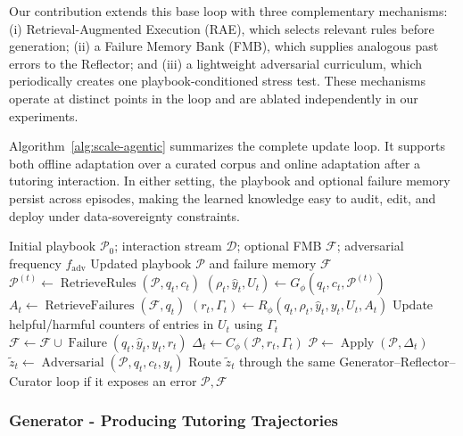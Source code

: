 \documentclass[10pt,conference]{IEEEtran}
\begin{document}
Our contribution extends this base loop with three complementary 
mechanisms: (i) Retrieval-Augmented Execution (RAE), which selects 
relevant rules before generation; (ii) a Failure Memory Bank (FMB), 
which supplies analogous past errors to the Reflector; and (iii) a 
lightweight adversarial curriculum, which periodically creates one 
playbook-conditioned stress test. These mechanisms operate at distinct 
points in the loop and are ablated independently in our experiments.

Algorithm~\ref{alg:scale-agentic} summarizes the complete update loop. 
It supports both offline adaptation over a curated corpus and online 
adaptation after a tutoring interaction. In either setting, the 
playbook and optional failure memory persist across episodes, making 
the learned knowledge easy to audit, edit, and deploy under 
data-sovereignty constraints.

\begin{algorithm}[t]
\caption{Self-improving agentic context engineering.}
\label{alg:scale-agentic}
\begin{algorithmic}[1]
\Require Initial playbook $\mathcal{P}_0$; interaction stream $\mathcal{D}$; optional FMB $\mathcal{F}$; adversarial frequency $f_{\mathrm{adv}}$
\Ensure Updated playbook $\mathcal{P}$ and failure memory $\mathcal{F}$
    \State $\mathcal{P}^{(t)} \gets \operatorname{RetrieveRules}(\mathcal{P},q_t,c_t)$ 
    \State $(\rho_t,\hat y_t,U_t) \gets G_\phi(q_t,c_t,\mathcal{P}^{(t)})$
    \State $A_t \gets \operatorname{RetrieveFailures}(\mathcal{F},q_t)$ 
    \State $(r_t,\Gamma_t) \gets R_\phi(q_t,\rho_t,\hat y_t,y_t,U_t,A_t)$
    \State Update helpful/harmful counters of entries in $U_t$ using $\Gamma_t$
        \State $\mathcal{F} \gets \mathcal{F} \cup \operatorname{Failure}(q_t,\hat y_t,y_t,r_t)$
    \EndIf
    \State $\Delta_t \gets C_\phi(\mathcal{P},r_t,\Gamma_t)$
    \State $\mathcal{P} \gets \operatorname{Apply}(\mathcal{P},\Delta_t)$
        \State $\tilde z_t \gets \operatorname{Adversarial}(\mathcal{P},q_t,c_t,y_t)$
        \State Route $\tilde z_t$ through the same Generator--Reflector--Curator loop if it exposes an error
    \EndIf
\EndFor
\State \Return $\mathcal{P},\mathcal{F}$
\end{algorithmic}
\end{algorithm}

\subsubsection{Generator - Producing Tutoring Trajectories}
\label{subsubsec:ace-generator}
\end{document}
